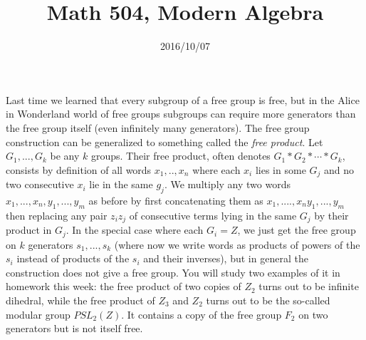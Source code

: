 \documentclass[10pt]{article}
\title{Math 504, Modern Algebra}
\date{2016/10/07}
\begin{document}
\maketitle

Last time we learned that every subgroup of a free group is free, but in
the Alice in Wonderland world of free groups subgroups can require more
generators than the free group itself (even infinitely many generators).
The free group construction can be generalized to something called the
{\sl free product}. Let $G_1,...,G_k$ be any $k$ groups. Their free
product, often denotes $G_1\ast G_2\ast\cdots\ast G_k$, consists by
definition of all words $x_1,..,x_n$ where each $x_i$ lies in some $G_j$
and no two consecutive $x_i$ lie in the same $g_j$. We multiply any two
words $x_1,...,x_n,y_1,...,y_m$ as before by first concatenating them as
$x_1,....,x_n y_1,...,y_m$ then replacing any pair $z_i z_j$ of
consecutive terms lying in the same $G_j$ by their product in $G_j$. In
the special case where each $G_i= Z$, we just get the free group on $k$
generators $s_1,...,s_k$ (where now we write words as products of powers
of the $s_i$ instead of products of the $s_i$ and their inverses), but
in general the construction does not give a free group. You will study
two examples of it in homework this week: the free product of two copies
of $Z_2$ turns out to be infinite dihedral, while the free product of
$Z_3$ and $Z_2$ turns out to be the so-called modular group $PSL_2(Z)$.
It contains a copy of the free group $F_2$ on two generators but is not
itself free.
\end{document}
